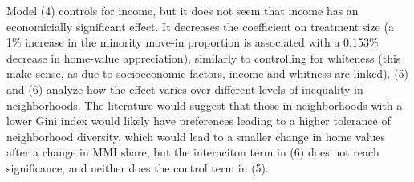 \documentclass{article}
\begin{document}
  Model (4) controls for income, but it does not seem that income has an
  economicially significant effect. It decreases the coefficient on
  treatment size (a 1\% increase in the minority move-in proportion is
  associated with a 0.153\% decrease in home-value appreciation),
  similarly to controlling for whiteness (this make sense, as due to
  socioeconomic factors, income and whitness are linked). (5) and (6)
  analyze how the effect varies over different levels of inequality in
  neighborhoods. The literature would suggest that those in
  neighborhoods with a lower Gini index would likely have preferences
  leading to a higher tolerance of neighborhood diversity, which would
  lead to a smaller change in home values after a change in MMI share,
  but the interaciton term in (6) does not reach significance, and
  neither does the control term in (5).
\end{document}
